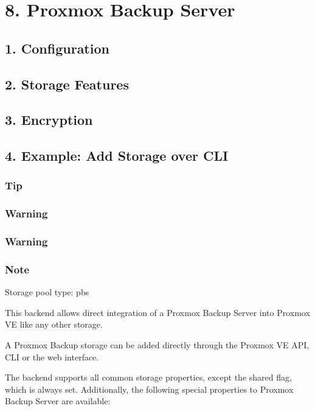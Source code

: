 \section{8. Proxmox Backup Server}

\subsection{1. Configuration}

\subsection{2. Storage Features}

\subsection{3. Encryption}

\subsection{4. Example: Add Storage over CLI}

\subsubsection{Tip}

\subsubsection{Warning}

\subsubsection{Warning}

\subsubsection{Note}

Storage pool type: pbs

This backend allows direct integration of a Proxmox Backup Server into Proxmox VE like any other storage.

A Proxmox Backup storage can be added directly through the Proxmox VE API, CLI or the web interface.

The backend supports all common storage properties, except the shared flag, which is always set. Additionally, the following special properties to Proxmox Backup Server are available:

